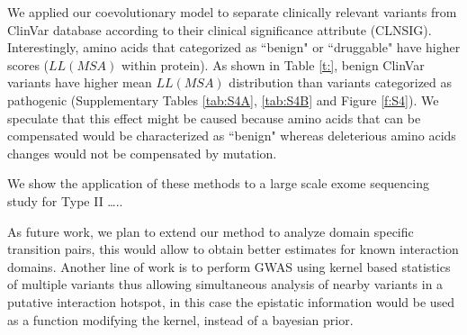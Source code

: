We applied our coevolutionary model to separate clinically relevant variants from ClinVar database \cite{landrum2013clinvar} according to their clinical significance attribute (CLNSIG). Interestingly, amino acids that categorized as ``benign" or ``druggable" have higher scores ($LL(MSA)$ within protein). As shown in Table \ref{t:}, benign ClinVar variants have higher mean $LL(MSA)$ distribution than variants categorized as pathogenic (Supplementary Tables \ref{tab:S4A}, \ref{tab:S4B} and Figure \ref{f:S4}). We speculate that this effect might be caused because amino acids that can be compensated would be characterized as ``benign" whereas deleterious amino acids changes would not be compensated by mutation. 

We show the application of these methods to a large scale exome sequencing study for Type II …..

As future work, we plan to extend our method to analyze domain specific transition pairs, this would allow to obtain better estimates for known interaction domains. Another line of work is to perform GWAS using kernel based statistics of multiple variants \cite{wu2011rare} thus allowing simultaneous analysis of nearby variants in a putative interaction hotspot, in this case the epistatic information would be used as a function modifying the kernel, instead of a bayesian prior.

